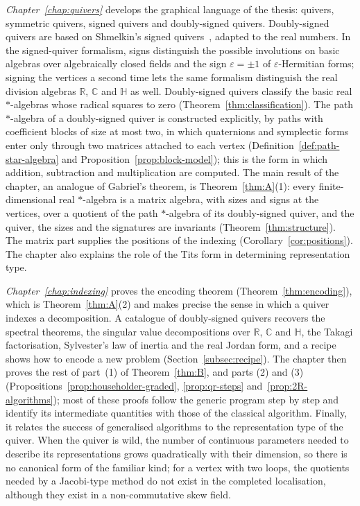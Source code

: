 \documentclass[12pt, a4paper]{report}
\theoremstyle{plain}
\theoremstyle{definition}
\theoremstyle{remark}
\theoremstyle{plain}
\newcommand{\RR}{\mathbb{R}}
\newcommand{\CC}{\mathbb{C}}
\newcommand{\HH}{\mathbb{H}}
\begin{document}
\emph{Chapter~\ref{chap:quivers}} develops the graphical language of the thesis: quivers, symmetric quivers, signed quivers and doubly-signed quivers. Doubly-signed quivers are based on Shmelkin's signed quivers~\cite{Shmelkin2006}, adapted to the real numbers. In the signed-quiver formalism, signs distinguish the possible involutions on basic algebras over algebraically closed fields and the sign $\varepsilon=\pm1$ of $\varepsilon$-Hermitian forms; signing the vertices a second time lets the same formalism distinguish the real division algebras $\RR$, $\CC$ and $\HH$ as well. Doubly-signed quivers classify the basic real $*$-algebras whose radical squares to zero (Theorem~\ref{thm:classification}). The path $*$-algebra of a doubly-signed quiver is constructed explicitly, by paths with coefficient blocks of size at most two, in which quaternions and symplectic forms enter only through two matrices attached to each vertex (Definition~\ref{def:path-star-algebra} and Proposition~\ref{prop:block-model}); this is the form in which addition, subtraction and multiplication are computed. The main result of the chapter, an analogue of Gabriel's theorem, is Theorem~\ref{thm:A}(1): every finite-dimensional real $*$-algebra is a matrix algebra, with sizes and signs at the vertices, over a quotient of the path $*$-algebra of its doubly-signed quiver, and the quiver, the sizes and the signatures are invariants (Theorem~\ref{thm:structure}). The matrix part supplies the positions of the indexing (Corollary~\ref{cor:positions}). The chapter also explains the role of the Tits form in determining representation type.

\emph{Chapter~\ref{chap:indexing}} proves the encoding theorem (Theorem~\ref{thm:encoding}), which is Theorem~\ref{thm:A}(2) and makes precise the sense in which a quiver indexes a decomposition. A catalogue of doubly-signed quivers recovers the spectral theorems, the singular value decompositions over $\RR$, $\CC$ and $\HH$, the Takagi factorisation, Sylvester's law of inertia and the real Jordan form, and a recipe shows how to encode a new problem (Section~\ref{subsec:recipe}). The chapter then proves the rest of part~(1) of Theorem~\ref{thm:B}, and parts (2) and (3) (Propositions~\ref{prop:householder-graded}, \ref{prop:qr-steps} and~\ref{prop:2R-algorithms}); most of these proofs follow the generic program step by step and identify its intermediate quantities with those of the classical algorithm. Finally, it relates the success of generalised algorithms to the representation type of the quiver. When the quiver is wild, the number of continuous parameters needed to describe its representations grows quadratically with their dimension, so there is no canonical form of the familiar kind; for a vertex with two loops, the quotients needed by a Jacobi-type method do not exist in the completed localisation, although they exist in a non-commutative skew field.
\end{document}
